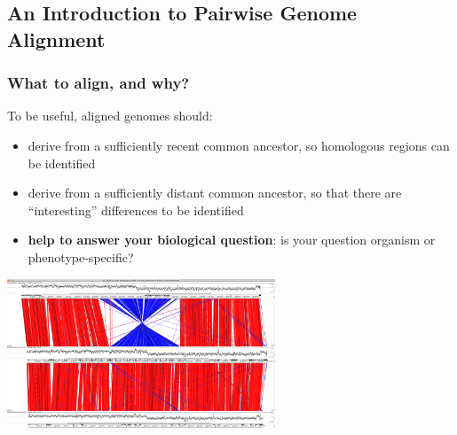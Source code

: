 

\subsection{An Introduction to Pairwise Genome Alignment}

\begin{frame}
  \frametitle{What to align, and why?}
  To be useful, aligned genomes should:
  \begin{itemize}
    \item derive from a sufficiently recent common ancestor, so homologous regions can be identified
    \item derive from a sufficiently distant common ancestor, so that there are ``interesting'' differences to be identified
    \item \textbf{help to answer your biological question}: is your question organism or phenotype-specific? 
  \end{itemize}
  \begin{center}
    \includegraphics[width=0.6\textwidth]{images/act_comparison}
  \end{center}  
\end{frame}

